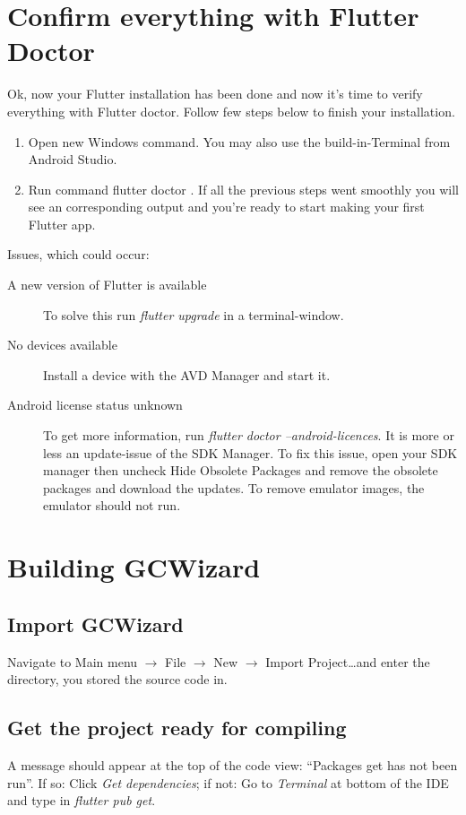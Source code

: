 \section{Confirm everything with Flutter Doctor}
Ok, now your Flutter installation has been done and now it’s time to verify everything with Flutter doctor. Follow few steps below to finish your installation.
\begin{enumerate}
    \item Open new Windows command. You may also use the build-in-Terminal from Android Studio.
    \item Run command flutter doctor . If all the previous steps went smoothly you will see an corresponding output and you’re ready to start making your first Flutter app.
\end{enumerate}
Issues, which could occur:
\begin{description}
    \item[A new version of Flutter is available] To solve this run \emph{flutter upgrade} in a terminal-window.
    \item[No devices available] Install a device with the AVD Manager and start it.
    \item[Android license status unknown] To get more information, run \emph{flutter doctor --android-licences}. It is more or less an update-issue of the SDK Manager. To fix this issue, open your SDK manager then uncheck Hide Obsolete Packages and remove the obsolete packages and download the updates. To remove emulator images, the emulator should not run.
\end{description}

\section{Building GCWizard}
\subsection{Import GCWizard}
Navigate to Main menu $\rightarrow$ File $\rightarrow$ New $\rightarrow$ Import Project\dots and enter the directory, you stored the source code in.

\subsection{Get the project ready for compiling}
A message should appear at the top of the code view: \enquote{Packages get has not been run}. If so: Click \emph{Get dependencies}; if not: Go to \emph{Terminal} at bottom of the IDE and type in \emph{flutter pub get}.

